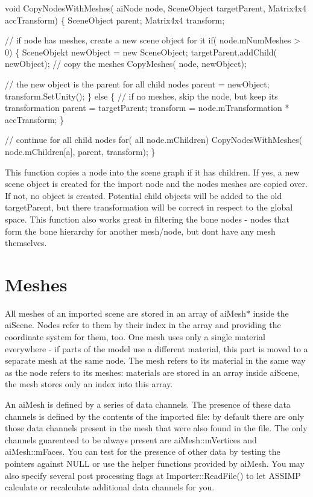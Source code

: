 \begin{DoxyCode}
\textcolor{keywordtype}{void} CopyNodesWithMeshes( aiNode node, SceneObject targetParent, Matrix4x4 accTransform)
\{
  SceneObject parent;
  Matrix4x4 transform;

  \textcolor{comment}{// if node has meshes, create a new scene object for it}
  \textcolor{keywordflow}{if}( node.mNumMeshes > 0)
  \{
    SceneObjekt newObject = \textcolor{keyword}{new} SceneObject;
    targetParent.addChild( newObject);
    \textcolor{comment}{// copy the meshes}
    CopyMeshes( node, newObject);

    \textcolor{comment}{// the new object is the parent for all child nodes}
    parent = newObject;
    transform.SetUnity();
  \} \textcolor{keywordflow}{else}
  \{
    \textcolor{comment}{// if no meshes, skip the node, but keep its transformation}
    parent = targetParent;
    transform = node.mTransformation * accTransform;
  \}

  \textcolor{comment}{// continue for all child nodes}
  \textcolor{keywordflow}{for}( all node.mChildren)
    CopyNodesWithMeshes( node.mChildren[a], parent, transform);
\}
\end{DoxyCode}


This function copies a node into the scene graph if it has children. If yes, a new scene object is created for the import node and the node\textquotesingle{}s meshes are copied over. If not, no object is created. Potential child objects will be added to the old target\+Parent, but there transformation will be correct in respect to the global space. This function also works great in filtering the bone nodes -\/ nodes that form the bone hierarchy for another mesh/node, but don\textquotesingle{}t have any mesh themselves.\hypertarget{data_meshes}{}\section{Meshes}\label{data_meshes}
All meshes of an imported scene are stored in an array of ai\+Mesh$\ast$ inside the ai\+Scene. Nodes refer to them by their index in the array and providing the coordinate system for them, too. One mesh uses only a single material everywhere -\/ if parts of the model use a different material, this part is moved to a separate mesh at the same node. The mesh refers to its material in the same way as the node refers to its meshes\+: materials are stored in an array inside ai\+Scene, the mesh stores only an index into this array.

An ai\+Mesh is defined by a series of data channels. The presence of these data channels is defined by the contents of the imported file\+: by default there are only those data channels present in the mesh that were also found in the file. The only channels guarenteed to be always present are ai\+Mesh\+::m\+Vertices and ai\+Mesh\+::m\+Faces. You can test for the presence of other data by testing the pointers against N\+U\+L\+L or use the helper functions provided by ai\+Mesh. You may also specify several post processing flags at Importer\+::\+Read\+File() to let A\+S\+S\+I\+M\+P calculate or recalculate additional data channels for you.

